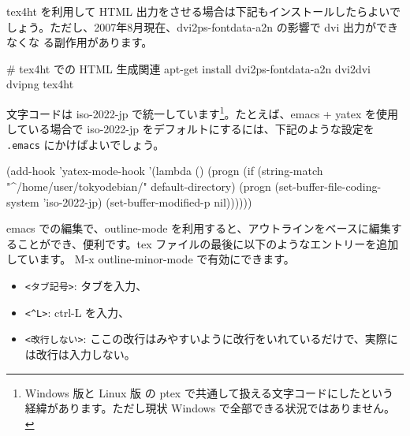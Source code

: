 \documentclass[mingoth,a4paper]{jsarticle}
\begin{document}
tex4ht を利用して HTML 出力をさせる場合は下記もインストールしたらよいで
しょう。ただし、2007年8月現在、dvi2ps-fontdata-a2n の影響で dvi 出力ができなくな
る副作用があります。

\begin{commandline}

# tex4ht での HTML 生成関連
apt-get install dvi2ps-fontdata-a2n dvi2dvi dvipng tex4ht
\end{commandline}

文字コードは iso-2022-jp で統一しています\footnote{Windows 版と Linux 版
の ptex で共通して扱える文字コードにしたという経緯があります。ただし現状
Windows で全部できる状況ではありません。}。たとえば、emacs + yatex を使用
している場合で iso-2022-jp をデフォルトにするには、下記のような設定を
\texttt{.emacs} にかけばよいでしょう。

\begin{commandline}
(add-hook 'yatex-mode-hook
	  '(lambda () 
	     (progn 
	       (if (string-match "^/home/user/tokyodebian/" default-directory)
		   (progn (set-buffer-file-coding-system 'iso-2022-jp)
			  (set-buffer-modified-p nil))))))
\end{commandline}


emacs での編集で、outline-mode を利用すると、アウトラインをベースに編集す
ることができ、便利です。tex ファイルの最後に以下のようなエントリーを追加
しています。
M-x outline-minor-mode で有効にできます。

\begin{commandline}
;;; Local Variables: ***
;;; outline-regexp: "\\([ <タブ記号>]*\\\\\\(documentstyle\\|documentclass\\|<改行しない>
dancersection\\)\\*?[ <タブ記号>]*[[{]\\|[%
;;; End: ***
\end{commandline}

\begin{itemize}
 \item 
 \verb!<タブ記号>!: タブを入力、
 \item  \verb!<^L>!: ctrl-L を入力、
 \item  \verb!<改行しない>!: ここの改行はみやすいように改行をいれているだけで、実際には改行は入力しない。
\end{itemize}
\end{document}
